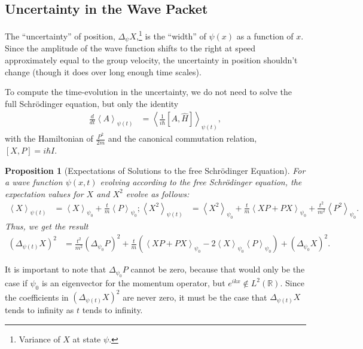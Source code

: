 \documentclass[12pt]{extarticle}
\newcommand{\R}{\mathbb{R}}
\theoremstyle{plain}
\newtheorem*{proposition}{Proposition}%
\theoremstyle{definition}
\theoremstyle{remark}
\renewcommand{\newline}{\hfill\break}
\begin{document}
    \subsection{Uncertainty in the Wave Packet}%
    The ``uncertainty'' of position, $\Delta_{\psi}X$,\footnote{Variance of $X$ at state $\psi$.} is the ``width'' of $\psi(x)$ as a function of $x$. Since the amplitude of the wave function shifts to the right at speed approximately equal to the group velocity, the uncertainty in position shouldn't change (though it does over long enough time scales).\newline

    To compute the time-evolution in the uncertainty, we do not need to solve the full Schrödinger equation, but only the identity
    \begin{align*}
      \frac{d}{dt}\left\langle A\right\rangle_{\psi(t)} &= \left\langle\frac{1}{i\hbar}[A,\hat{H}]\right\rangle_{\psi(t)},
    \end{align*}
    with the Hamiltonian of $\frac{P^2}{2m}$ and the canonical commutation relation, $[X,P] = i\hbar I$.
    \begin{proposition}[Expectations of Solutions to the free Schrödinger Equation]
      For a wave function $\psi(x,t)$ evolving according to the free Schrödinger equation, the expectation values for $X$ and $X^2$ evolve as follows:
      \begin{align*}
        \left\langle X \right\rangle_{\psi(t)} &= \left\langle X\right\rangle_{\psi_0} + \frac{t}{m}\left\langle P \right\rangle_{\psi_0};
        \left\langle X^2 \right\rangle_{\psi(t)} &= \left\langle X^2 \right\rangle_{\psi_0} + \frac{t}{m}\left\langle XP + PX \right\rangle_{\psi_0} + \frac{t^2}{m^2}\left\langle P^2 \right\rangle_{\psi_0}.
      \end{align*}
      Thus, we get the result
      \begin{align*}
        \left(\Delta_{\psi(t)} X\right)^{2} &= \frac{t^2}{m^2}\left(\Delta_{\psi_0}P\right)^2 + \frac{t}{m}\left(\left\langle XP + PX \right\rangle_{\psi_0} - 2\left\langle X \right\rangle_{\psi_0}\left\langle P \right\rangle_{\psi_0}\right) + \left(\Delta_{\psi_0}X\right)^2.
      \end{align*}
    \end{proposition}
    It is important to note that $\Delta_{\psi_0}P$ cannot be zero, because that would only be the case if $\psi_0$ is an eigenvector for the momentum operator, but $e^{ikx}\notin L^{2}(\R)$. Since the coefficients in $\left(\Delta_{\psi(t)}X\right)^2$ are never zero, it must be the case that $\Delta_{\psi(t)}X$ tends to infinity as $t$ tends to infinity.
\end{document}
